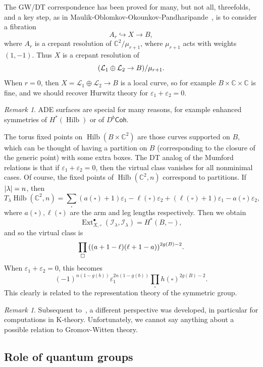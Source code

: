 \documentclass[leqno, openany]{memoir}
\theoremstyle{definition}
\theoremstyle{remark}
\newtheorem{rmk}[thm]{Remark}
\theoremstyle{plain}
\theoremstyle{definition}
\theoremstyle{remark}
\newcommand{\C}{\mathbb{C}}
\newcommand{\ep}{\varepsilon}
\newcommand{\mc}[1]{\mathcal{#1}}
\newcommand{\ms}[1]{\mathsf{#1}}
\DeclareMathOperator{\Ext}{Ext}
\DeclareMathOperator{\Hilb}{Hilb}
\begin{document}
The GW/DT correspondence has been proved for many, but not all, threefolds, and a key step, as in Maulik-Oblomkov-Okounkov-Pandharipande~\cite{moop}, is to consider a fibration
\[ A_r \hookrightarrow X \to B, \]
where $A_r$ is a crepant resolution of $\C^2/\mu_{r+1}$, where $\mu_{r+1}$ acts with weights $(1, -1)$. Thus $X$ is a crepant resolution of 
\[ \qty(\mc{L}_1 \oplus \mc{L}_2 \to B) / \mu_{r+1}. \]
When $r = 0$, then $X = \mc{L}_1 \oplus \mc{L}_2 \to B$ is a local curve, so for example $B \times \C \times \C$ is fine, and we should recover Hurwitz theory for $\ep_1 + \ep_2 = 0$.

\begin{rmk}
    ADE surfaces are special for many reasons, for example enhanced symmetries of $H^*(\Hilb)$ or of $D^b \ms{Coh}$.
\end{rmk}

The torus fixed points on $\Hilb(B \times \C^2)$ are those curves supported on $B$, which can be thought of having a partition on $B$ (corresponding to the closure of the generic point) with some extra boxes. The DT analog of the Mumford relations is that if $\ep_1 + \ep_2 = 0$, then the virtual class vanishes for all nonminimal cases. Of course, the fixed points of $\Hilb(\C^2, n)$ correspond to partitions. If $\abs{\lambda} = n$, then
\[ T_{\lambda} \Hilb(\C^2, n) = \sum_{\square} (a(\square) + 1) \ep_1 - \ell(\square) \ep_2 + (\ell(\square) + 1) \ep_1 - a(\square) \ep_2, \]
where $a(\square), \ell(\square)$ are the arm and leg lengths respectively. Then we obtain
\[ \Ext^{\bullet}_{X, \circ} (\mc{I}_{\lambda}, \mc{I}_{\lambda}) = H^*(B, -), \]
and so the virtual class is
\[ \prod_{\square} \qty((a+1-\ell)(\ell+1-a))^{2g(B)-2}. \]
When $\ep_1 + \ep_2 = 0$, this becomes
\[ (-1)^{n(1-g(b))} \ep_1^{2n(1-g(b))} \prod_{\square} h(\square)^{2g(B)-2}. \]
This clearly is related to the representation theory of the symmetric group.

\begin{rmk}
    Subsequent to~\cite{moop}, a different perspective was developed, in particular for computations in K-theory. Unfortunately, we cannot say anything about a possible relation to Gromov-Witten theory.
\end{rmk}

\subsection{Role of quantum groups}
\end{document}
